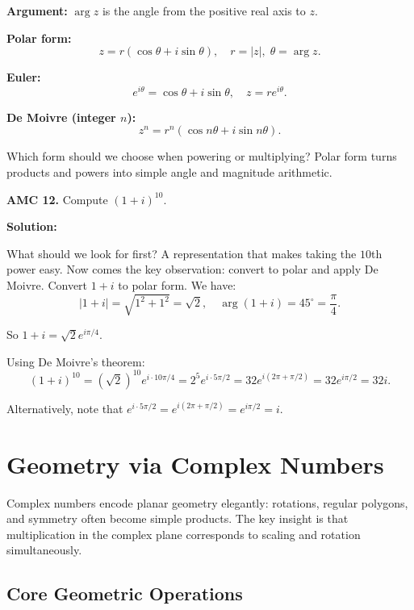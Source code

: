 \documentclass[12pt]{extarticle}
\begin{document}
\textbf{Argument:} $\arg z$ is the angle from the positive real axis to $z$.

\textbf{Polar form:}
\[
 z = r(\cos\theta + i\sin\theta), \quad r=|z|, \; \theta=\arg z.
\]

\textbf{Euler:}
\[
 e^{i\theta} = \cos\theta + i\sin\theta, \quad z = r e^{i\theta}.
\]

\textbf{De Moivre (integer $n$):}
\[
 z^n = r^n(\cos n\theta + i\sin n\theta).
\]

Which form should we choose when powering or multiplying? Polar form turns products and powers into simple angle and magnitude arithmetic.

\begin{examplebox}
\textbf{AMC 12.} Compute $(1+i)^{10}$.
\end{examplebox}

\textbf{Solution:}

What should we look for first? A representation that makes taking the $10$th power easy.
Now comes the key observation: convert to polar and apply De Moivre.
Convert $1 + i$ to polar form. We have:
\[
|1 + i| = \sqrt{1^2 + 1^2} = \sqrt{2}, \quad \arg(1 + i) = 45^\circ = \frac{\pi}{4}.
\]

So $1 + i = \sqrt{2} e^{i\pi/4}$.

Using De Moivre's theorem:
\[
(1 + i)^{10} = \left(\sqrt{2}\right)^{10} e^{i \cdot 10\pi/4} = 2^5 e^{i \cdot 5\pi/2} = 32 e^{i(2\pi + \pi/2)} = 32 e^{i\pi/2} = 32i.
\]

Alternatively, note that $e^{i \cdot 5\pi/2} = e^{i(2\pi + \pi/2)} = e^{i\pi/2} = i$.


\section{Geometry via Complex Numbers}

\begin{conceptbox}
Complex numbers encode planar geometry elegantly: rotations, regular polygons, and symmetry often become simple products. The key insight is that multiplication in the complex plane corresponds to scaling and rotation simultaneously.
\end{conceptbox}

\subsection*{Core Geometric Operations}
\end{document}
